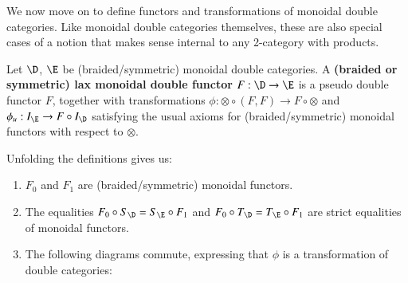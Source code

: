 We now move on to define functors and transformations of monoidal double categories.
Like monoidal double categories themselves, these are also special cases of a notion that makes sense internal to any 2-category with products.

\begin{defn}\label{def:monfunc}
  Let $\D$, $\E$ be (braided/symmetric) monoidal double categories.  A {\bf (braided or symmetric) lax monoidal double functor} $F: \D \rightarrow \E$ is a pseudo double functor $F$, together with transformations $\phi : \otimes \circ (F,F) \rightarrow F \circ \otimes$ and $\phi_u:I_{\E}\rightarrow F \circ I_{\D}$ satisfying the usual axioms for (braided/symmetric) monoidal functors with respect to $\otimes$.
\end{defn}

Unfolding the definitions gives us:

\begin{enumerate}
\item $F_0$ and $F_1$ are (braided/symmetric) monoidal functors.
\item The equalities $F_0 \circ S_\D = S_\E \circ F_1$ and $F_0 \circ T_\D = T_\E \circ F_1$ are strict equalities of monoidal functors.
\item The following diagrams commute, expressing that $\phi$ is a transformation of double categories:



\end{enumerate}

